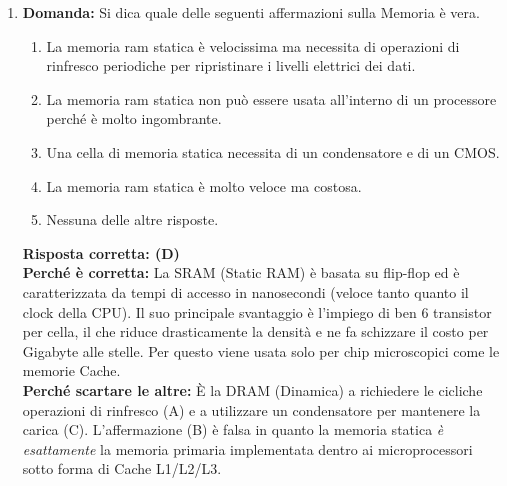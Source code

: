 \documentclass[12pt, a4paper]{article}
\begin{document}
\begin{enumerate}

    \item \textbf{Domanda:} Si dica quale delle seguenti affermazioni sulla Memoria è vera.
    \begin{enumerate}[label=(\Alph*)]
        \item La memoria ram statica è velocissima ma necessita di operazioni di rinfresco periodiche per ripristinare i livelli elettrici dei dati.
        \item La memoria ram statica non può essere usata all'interno di un processore perché è molto ingombrante.
        \item Una cella di memoria statica necessita di un condensatore e di un CMOS.
        \item La memoria ram statica è molto veloce ma costosa.
        \item Nessuna delle altre risposte.
    \end{enumerate}
    \textbf{Risposta corretta: (D)} \\
    \textbf{Perché è corretta:} La SRAM (Static RAM) è basata su flip-flop ed è caratterizzata da tempi di accesso in nanosecondi (veloce tanto quanto il clock della CPU). Il suo principale svantaggio è l'impiego di ben 6 transistor per cella, il che riduce drasticamente la densità e ne fa schizzare il costo per Gigabyte alle stelle. Per questo viene usata solo per chip microscopici come le memorie Cache. \\
    \textbf{Perché scartare le altre:} È la DRAM (Dinamica) a richiedere le cicliche operazioni di rinfresco (A) e a utilizzare un condensatore per mantenere la carica (C). L'affermazione (B) è falsa in quanto la memoria statica \textit{è esattamente} la memoria primaria implementata dentro ai microprocessori sotto forma di Cache L1/L2/L3.


\end{enumerate}
\end{document}
